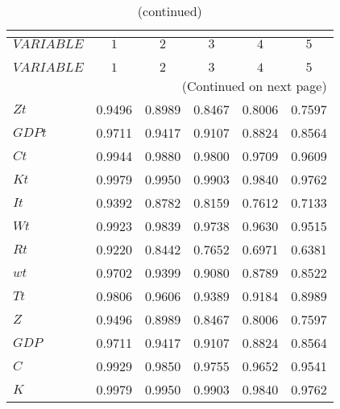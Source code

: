  
\begin{center}
\begin{longtable}{lccccc} 
\caption{AUTOCORRELATION OF SIMULATED VARIABLES}\\
 \label{Table:sim_autocorr_matrix}\\
\toprule 
$VARIABLE  $	 & 	 $         1$	 & 	 $         2$	 & 	 $         3$	 & 	 $         4$	 & 	 $         5$\\
\midrule \endfirsthead 
\caption{(continued)}\\
 \toprule \\ 
$VARIABLE  $	 & 	 $         1$	 & 	 $         2$	 & 	 $         3$	 & 	 $         4$	 & 	 $         5$\\
\midrule \endhead 
\midrule \multicolumn{6}{r}{(Continued on next page)} \\ \bottomrule \endfoot 
\bottomrule \endlastfoot 
$Zt        $	 & 	    0.9496	 & 	    0.8989	 & 	    0.8467	 & 	    0.8006	 & 	    0.7597 \\ 
$GDPt      $	 & 	    0.9711	 & 	    0.9417	 & 	    0.9107	 & 	    0.8824	 & 	    0.8564 \\ 
$Ct        $	 & 	    0.9944	 & 	    0.9880	 & 	    0.9800	 & 	    0.9709	 & 	    0.9609 \\ 
$Kt        $	 & 	    0.9979	 & 	    0.9950	 & 	    0.9903	 & 	    0.9840	 & 	    0.9762 \\ 
$It        $	 & 	    0.9392	 & 	    0.8782	 & 	    0.8159	 & 	    0.7612	 & 	    0.7133 \\ 
$Wt        $	 & 	    0.9923	 & 	    0.9839	 & 	    0.9738	 & 	    0.9630	 & 	    0.9515 \\ 
$Rt        $	 & 	    0.9220	 & 	    0.8442	 & 	    0.7652	 & 	    0.6971	 & 	    0.6381 \\ 
$wt        $	 & 	    0.9702	 & 	    0.9399	 & 	    0.9080	 & 	    0.8789	 & 	    0.8522 \\ 
$Tt        $	 & 	    0.9806	 & 	    0.9606	 & 	    0.9389	 & 	    0.9184	 & 	    0.8989 \\ 
$Z         $	 & 	    0.9496	 & 	    0.8989	 & 	    0.8467	 & 	    0.8006	 & 	    0.7597 \\ 
$GDP       $	 & 	    0.9711	 & 	    0.9417	 & 	    0.9107	 & 	    0.8824	 & 	    0.8564 \\ 
$C         $	 & 	    0.9929	 & 	    0.9850	 & 	    0.9755	 & 	    0.9652	 & 	    0.9541 \\ 
$K         $	 & 	    0.9979	 & 	    0.9950	 & 	    0.9903	 & 	    0.9840	 & 	    0.9762 \\ 

\end{longtable}
\end{center}
